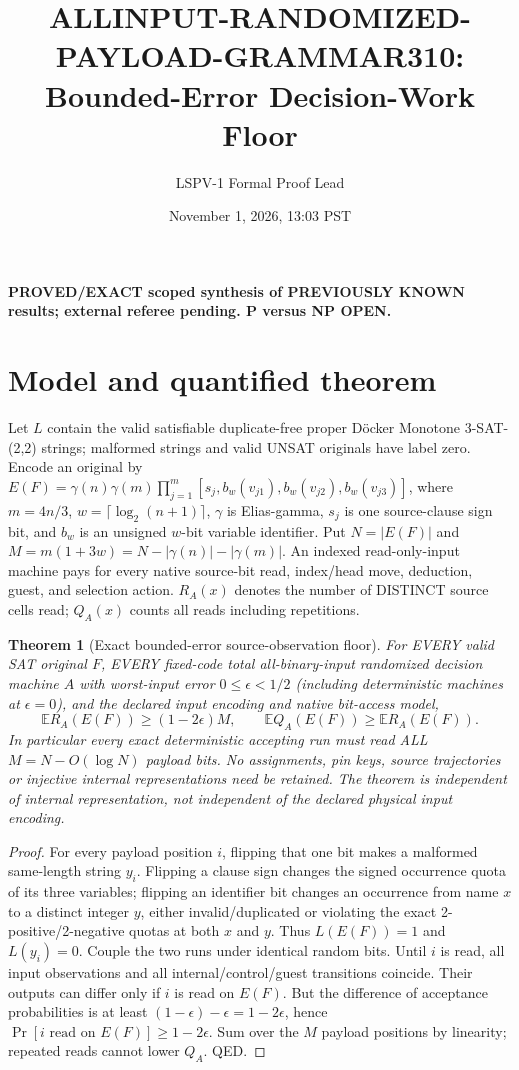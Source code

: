 \documentclass[11pt]{article}
\title{ALLINPUT-RANDOMIZED-PAYLOAD-GRAMMAR310: Bounded-Error Decision-Work Floor}
\author{LSPV-1 Formal Proof Lead}
\date{November 1, 2026, 13:03 PST}
\newtheorem{theorem}{Theorem}
\begin{document}
\maketitle
\noindent\textbf{PROVED/EXACT scoped synthesis of PREVIOUSLY KNOWN results; external referee pending. P versus NP OPEN.}
\section{Model and quantified theorem}
Let $L$ contain the valid satisfiable duplicate-free proper D\"ocker Monotone 3-SAT-(2,2) strings; malformed strings and valid UNSAT originals have label zero. Encode an original by $E(F)=\gamma(n)\gamma(m)\prod_{j=1}^m[s_j,b_w(v_{j1}),b_w(v_{j2}),b_w(v_{j3})]$, where $m=4n/3$, $w=\lceil\log_2(n+1)\rceil$, $\gamma$ is Elias-gamma, $s_j$ is one source-clause sign bit, and $b_w$ is an unsigned $w$-bit variable identifier. Put $N=|E(F)|$ and $M=m(1+3w)=N-|\gamma(n)|-|\gamma(m)|$. An indexed read-only-input machine pays for every native source-bit read, index/head move, deduction, guest, and selection action. $R_A(x)$ denotes the number of DISTINCT source cells read; $Q_A(x)$ counts all reads including repetitions.
\begin{theorem}[Exact bounded-error source-observation floor]
For EVERY valid SAT original $F$, EVERY fixed-code total all-binary-input randomized decision machine $A$ with worst-input error $0\le\epsilon<1/2$ (including deterministic machines at $\epsilon=0$), and the declared input encoding and native bit-access model,
\[
\boxed{\mathbb E R_A(E(F))\ge(1-2\epsilon)M,\qquad
\mathbb E Q_A(E(F))\ge\mathbb E R_A(E(F)).}
\]
In particular every exact deterministic accepting run must read ALL $M=N-O(\log N)$ payload bits. No assignments, pin keys, source trajectories or injective internal representations need be retained. The theorem is independent of internal representation, not independent of the declared physical input encoding.
\end{theorem}
\begin{proof}
For every payload position $i$, flipping that one bit makes a malformed same-length string $y_i$. Flipping a clause sign changes the signed occurrence quota of its three variables; flipping an identifier bit changes an occurrence from name $x$ to a distinct integer $y$, either invalid/duplicated or violating the exact 2-positive/2-negative quotas at both $x$ and $y$. Thus $L(E(F))=1$ and $L(y_i)=0$. Couple the two runs under identical random bits. Until $i$ is read, all input observations and all internal/control/guest transitions coincide. Their outputs can differ only if $i$ is read on $E(F)$. But the difference of acceptance probabilities is at least $(1-\epsilon)-\epsilon=1-2\epsilon$, hence $\Pr[i\text{ read on }E(F)]\ge1-2\epsilon$. Sum over the $M$ payload positions by linearity; repeated reads cannot lower $Q_A$. QED.
\end{proof}
\end{document}
